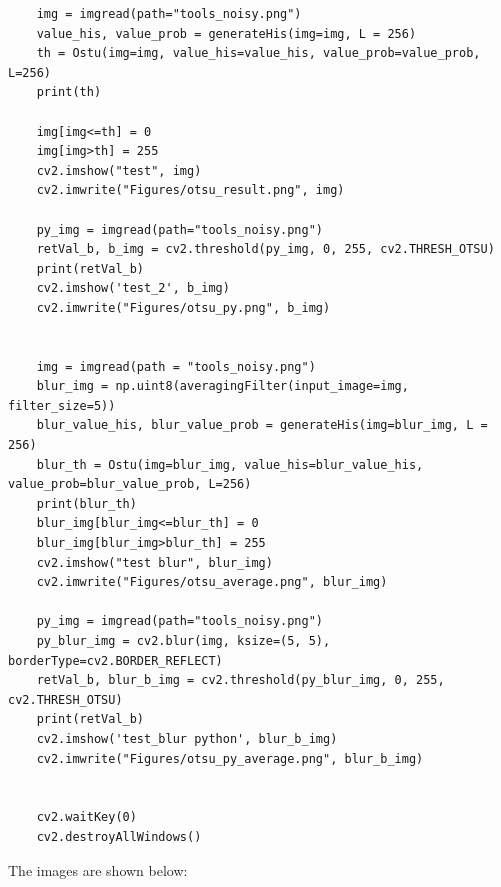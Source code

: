 \documentclass[12pt]{article}
\begin{document}
\begin{enumerate}[1]
\begin{enumerate}
\begin{lstlisting}
    img = imgread(path="tools_noisy.png")
    value_his, value_prob = generateHis(img=img, L = 256)
    th = Ostu(img=img, value_his=value_his, value_prob=value_prob, L=256)
    print(th)

    img[img<=th] = 0
    img[img>th] = 255
    cv2.imshow("test", img)
    cv2.imwrite("Figures/otsu_result.png", img)

    py_img = imgread(path="tools_noisy.png")
    retVal_b, b_img = cv2.threshold(py_img, 0, 255, cv2.THRESH_OTSU)
    print(retVal_b)
    cv2.imshow('test_2', b_img)
    cv2.imwrite("Figures/otsu_py.png", b_img)


    img = imgread(path = "tools_noisy.png")
    blur_img = np.uint8(averagingFilter(input_image=img, filter_size=5))
    blur_value_his, blur_value_prob = generateHis(img=blur_img, L = 256)
    blur_th = Ostu(img=blur_img, value_his=blur_value_his, value_prob=blur_value_prob, L=256)
    print(blur_th)
    blur_img[blur_img<=blur_th] = 0
    blur_img[blur_img>blur_th] = 255
    cv2.imshow("test blur", blur_img)
    cv2.imwrite("Figures/otsu_average.png", blur_img)

    py_img = imgread(path="tools_noisy.png")
    py_blur_img = cv2.blur(img, ksize=(5, 5), borderType=cv2.BORDER_REFLECT)
    retVal_b, blur_b_img = cv2.threshold(py_blur_img, 0, 255, cv2.THRESH_OTSU)
    print(retVal_b)
    cv2.imshow('test_blur python', blur_b_img)
    cv2.imwrite("Figures/otsu_py_average.png", blur_b_img)


    cv2.waitKey(0)
    cv2.destroyAllWindows()
\end{lstlisting}
The images are shown below:

    \begin{figure}[H]
        \centering
    

\end{figure}
\end{enumerate}
\end{enumerate}
\end{document}
